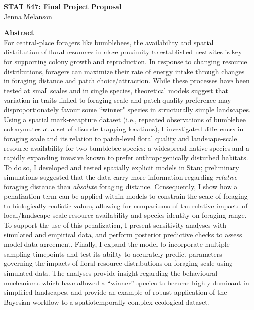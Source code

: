 \documentclass[11pt]{article}
\begin{document}
\setcounter{page}{1}
\begin{center}
\large
\textbf{STAT 547: Final Project Proposal} \\
\normalsize
Jenna Melanson
\end{center}

\textbf{Abstract} \\
 
 For central-place foragers like bumblebees, the availability and spatial distribution of floral resources in close proximity to established nest sites is key for supporting colony growth and reproduction. In response to changing resource distributions, foragers can maximize their rate of energy intake through changes in foraging distance and patch choice/attraction. While these processes have been tested at small scales and in single species, theoretical models suggest that variation in traits linked to foraging scale and patch quality preference may disproportionately favour some ``winner" species in structurally simple landscapes. Using a spatial mark-recapture dataset (i.e., repeated observations of bumblebee colonymates at a set of discrete trapping locations), I investigated differences in foraging scale and its relation to patch-level floral quality and landscape-scale resource availability for two bumblebee species: a widespread native species and a rapidly expanding invasive known to prefer anthropogenically disturbed habitats. To do so, I developed and tested spatially explicit models in Stan; preliminary simulations suggested that the data carry more information regarding \emph{relative} foraging distance than \emph{absolute} foraging distance. Consequently, I show how a penalization term can be applied within models to constrain the scale of foraging to biologically realistic values, allowing for comparisons of the relative impacts of local/landscape-scale resource availability and species identity on foraging range. To support the use of this penalization, I present sensitivity analyses with simulated and empirical data, and perform posterior predictive checks to assess model-data agreement. Finally, I expand the model to incorporate multiple sampling timepoints and test its ability to accurately predict parameters governing the impacts of floral resource distributions on foraging scale using simulated data. The analyses provide insight regarding the behavioural mechanisms which have allowed a ``winner'' species to become highly dominant in simplified landscapes, and provide an example of robust application of the Bayesian workflow to a spatiotemporally complex ecological dataset.
\end{document}
